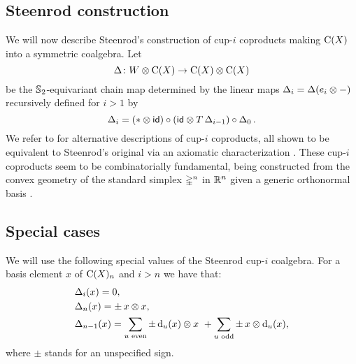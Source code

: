 %	

\subsection{Steenrod construction} \label{ss:cup-i}

We will now describe Steenrod's construction of cup-$i$ coproducts \cite[p.293]{steenrod1947products} making $\operatorname{C}(X)$ into a symmetric coalgebra.
Let
\[
\Delta \colon W \otimes \operatorname{C}(X) \to \operatorname{C}(X) \otimes \operatorname{C}(X)
\]
be the $\mathbb{S}_2$-equivariant chain map determined by the linear maps $\Delta_i = \Delta(e_i \otimes -)$ recursively defined for $i > 1$ by
\begin{equation*} \label{e:cup-i coproducts}
	\operatorname{\Delta}_i =
	(\ast \otimes \mathsf{id}) \circ (\mathsf{id} \otimes T\operatorname{\Delta}_{i-1}) \circ \operatorname{\Delta}_0.
\end{equation*}
We refer to \cite{real1996computability, gonzalez-diaz1999steenrod, mcclure2003multivariable, medina2021fast_sq} for alternative descriptions of cup-$i$ coproducts, all shown to be equivalent to Steenrod's original via an axiomatic characterization \cite{medina2022axiomatic}.
These cup-$i$ coproducts seem to be combinatorially fundamental, being constructed from the convex geometry of the standard simplex $\mathbb{\Delta}^n$ in $\mathbb{R}^n$ given a generic orthonormal basis \cite{medina2022fib_poly}.

\subsection{Special cases}

We will use the following special values of the Steenrod cup-$i$ coalgebra.
For a basis element $x$ of $\operatorname{C}(X)_n$ and $i > n$ we have that:
\begin{align}
	&\Delta_i(x) = 0, \\
	&\Delta_n(x) = \pm \, x \otimes x, \\
	&\Delta_{n-1}(x) =
	\sum_{u \text{ even}} \pm \operatorname{d}_u(x) \otimes x \ +
	\sum_{u \text{ odd}} \pm \, x \otimes \operatorname{d}_u(x),
\end{align}
where $\pm$ stands for an unspecified sign.


